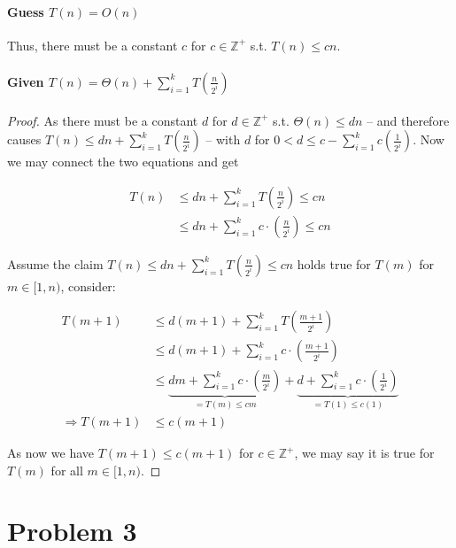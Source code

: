 \documentclass[11pt]{article}
\begin{document}
\paragraph{Guess $T(n) = O(n)$\newline}
Thus, there must be a constant $c$ for $c \in \mathbb{Z^+}$ s.t. $T(n) \leq cn$.

\paragraph{Given $T(n) = \Theta(n) + \sum^{k}_{i = 1} T(\frac{n}{2^i})$\newline}
\begin{proof}
As there must be a constant $d$ for $d \in \mathbb{Z^+}$ s.t. $\Theta(n) \leq dn$ -- and therefore causes $T(n) \leq dn + \sum^{k}_{i = 1} T(\frac{n}{2^i})$ -- with $d$ for $0 < d \leq c - \sum^{k}_{i = 1} c(\frac{1}{2^i})$. Now we may connect the two equations and get

\begin{align}
    T(n) &\leq dn + \sum^{k}_{i = 1} T(\frac{n}{2^i}) \leq cn \\
    &\leq dn + \sum^{k}_{i = 1} c \cdot (\frac{n}{2^i}) \leq cn \nonumber
\end{align}

Assume the claim $T(n) \leq dn + \sum^{k}_{i = 1} T(\frac{n}{2^i}) \leq cn$ holds true for $T(m)$ for $m \in [1, n)$, consider:

\begin{align}
    T(m+1) &\leq d(m + 1) + \sum^{k}_{i = 1} T(\frac{m+1}{2^i}) \\
    &\leq d(m + 1) + \sum^{k}_{i = 1} c \cdot (\frac{m+1}{2^i}) \nonumber \\
    &\leq \underbrace{dm + \sum^{k}_{i = 1} c \cdot (\frac{m}{2^i})}_{= T(m) \leq cm} + \underbrace{d + \sum^{k}_{i = 1} c \cdot (\frac{1}{2^i})}_{= T(1) \leq c(1)} \\
    \Longrightarrow T(m+1) &\leq c(m+1)
\end{align}


As now we have $T(m+1) \leq c(m+1)$ for $c \in \mathbb{Z^+}$, we may say it is true for $T(m)$ for all $m \in [1, n)$.
\end{proof}


\section{Problem 3}
\end{document}
